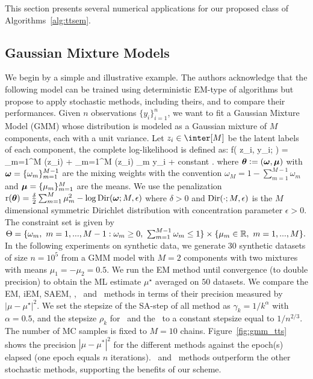 \documentclass[11pt]{article}
\theoremstyle{t}
\begin{document}
This section presents several numerical applications for our proposed class of Algorithms~\ref{alg:ttsem}.

\vspace{-0.05in}
\subsection{Gaussian Mixture Models}
\vspace{-0.05in}

We begin by a simple and illustrative example.
The authors acknowledge that the following model can be trained using deterministic EM-type of algorithms but propose to apply stochastic methods, including theirs, and to compare their performances.
Given $n$ observations $\{y_i\}_{i=1}^n$, we want to fit a Gaussian Mixture Model (GMM) whose distribution is modeled as a Gaussian mixture of $M$ components, each with a unit variance. 
Let $z_i \in \inter[M]$ be the latent labels of each component, the complete log-likelihood is defined as:
\beq \notag \textstyle
\log f( z_i, y_i; \param) =
\sum_{m=1}^{M} (z_i)  + \sum_{m=1}^M (z_i) \mu_m y_i + {\rm constant} \eqsp.
\eeq
where $\param \eqdef (\bomega, \bmu)$ with $\bomega= \{\omega_{m}\}_{m=1}^{M-1}$ are the mixing weights with the convention $\omega_M= 1 - \sum_{m=1}^{M-1} \omega_m$  and $\bmu= \{\mu_m \}_{m =1}^M$ are the means.  We use the penalization $\Pen(\param)= \frac{\delta}{2}\sum_{m=1}^M \mu_m^2 - \log \Dir(\bomega; M, \epsilon)$ where $\delta > 0$ and $\Dir(\cdot; M,\epsilon)$ is the $M$ dimensional symmetric Dirichlet distribution with concentration parameter $\epsilon > 0$.
The constraint set is given by $\Param = \{ \omega_m,~m=1,...,M-1 : \omega_m \geq 0,~\sum_{m=1}^{M-1} \omega_m \leq 1\} \times \{ \mu_m \in \rset ,~m=1,...,M \}.$ In the following experiments on synthetic data, we generate $30$ synthetic datasets of size $n = 10^5$ from a GMM model with $M=2$ components with two mixtures with means $\mu_1 = - \mu_2 = 0.5$.
We run the EM method until convergence (to double precision) to obtain the ML estimate $\mu^\star$ averaged on $50$ datasets. We compare the EM, iEM, SAEM, \ISAEM, \SAEMVR\ and \FISAEM\ methods in terms of their precision measured by $| \mu - \mu^\star |^2$. 
We set the stepsize of the \textsf{SA-step} of all method as $\gamma_k = 1/k^{\alpha}$ with $\alpha = 0.5$, and the stepsize $\rho_k$ for \SAEMVR\ and the \FISAEM\ to a constant stepsize equal to $1/n^{2/3}$. The number of MC samples is fixed to $M=10$ chains.
Figure~\ref{fig:gmm_tts} shows the precision $|\mu - \mu^*|^2$ for the different methods against the epoch(s) elapsed (one epoch equals $n$ iterations). 
\SAEMVR\ and \FISAEM\ methods outperform the other stochastic methods, supporting the benefits of our scheme.
\end{document}
